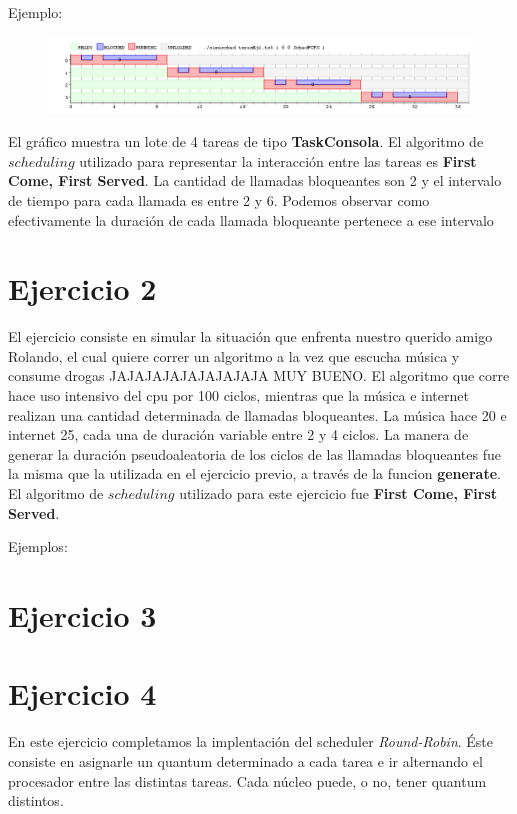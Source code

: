 \documentclass[11pt]{article}
\begin{document}
Ejemplo: 

      \begin{figure}[H]
        \includegraphics[scale=0.5]{ejercicio1}
      \end{figure}

El gráfico muestra un lote de 4 tareas de tipo \textbf{TaskConsola}. El algoritmo de $scheduling$ utilizado para representar la interacción 
entre las tareas es \textbf{First Come, First Served}. La cantidad de llamadas bloqueantes son 2 y el intervalo de 
tiempo para cada llamada es entre 2 y 6. Podemos observar como efectivamente la duración de cada llamada bloqueante pertenece a ese 
intervalo

\newpage

\section{Ejercicio 2}

El ejercicio consiste en simular la situación que enfrenta nuestro querido amigo Rolando, el cual quiere correr un algoritmo a la vez que escucha 
música y consume drogas JAJAJAJAJAJAJAJAJA MUY BUENO.  El algoritmo que corre hace uso intensivo del cpu por 100 ciclos, mientras que la música e internet realizan una 
cantidad determinada de llamadas bloqueantes. La música hace 20 e internet 25, cada una de duración variable entre 2 y 4 ciclos. La manera 
de generar la duración pseudoaleatoria de los ciclos de las llamadas bloqueantes fue la misma que la utilizada en el ejercicio previo, a través 
de la funcion \textbf{generate}. El algoritmo de $scheduling$ utilizado para este ejercicio fue \textbf{First Come, First Served}.

Ejemplos:

\section{Ejercicio 3}

\newpage 

\section{Ejercicio 4}

En este ejercicio completamos la implentación del scheduler \textit{Round-Robin}. Éste consiste en asignarle un quantum determinado a cada tarea e ir alternando el procesador entre las distintas tareas. Cada núcleo puede, o no, tener quantum distintos. 
\end{document}
